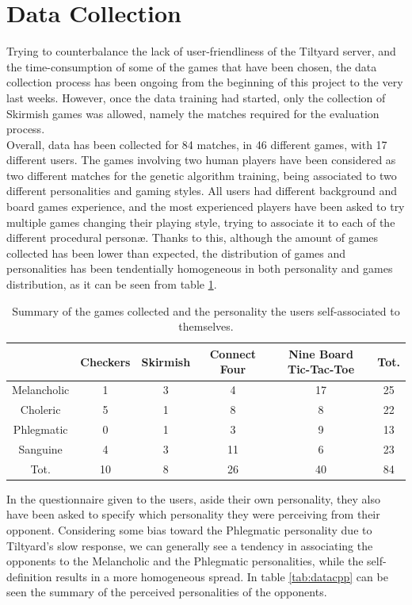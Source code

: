 \section{Data Collection}\label{subsec:dataresults}
Trying to counterbalance the lack of user-friendliness of the Tiltyard server, and the time-consumption of some of the games that have been chosen, the data collection process has been ongoing from the beginning of this project to the very last weeks. However, once the data training had started, only the collection of Skirmish games was allowed, namely the matches required for the evaluation process.\\
Overall, data has been collected for 84 matches, in 46 different games, with 17 different users. The games involving two human players have been considered as two different matches for the genetic algorithm training, being associated to two different personalities and gaming styles. All users had different background and board games experience, and the most experienced players have been asked to try multiple games changing their playing style, trying to associate it to each of the different procedural personæ. Thanks to this, although the amount of games collected has been lower than expected, the distribution of games and personalities has been tendentially homogeneous in both personality and games distribution, as it can be seen from table \ref{tab:datac}.\\
\begin{table}[h]
    \caption{Summary of the games collected and the personality the users self-associated to themselves.}
    \centering
    \scriptsize
	\begin{tabular}{|c|c|c|c|c||c|}
    	\hline
					& Checkers & Skirmish & Connect Four & Nine Board Tic-Tac-Toe & Tot. \\
        \hline
        Melancholic & 1  & 3 & 4  & 17 & 25 \\
        \hline
        Choleric	& 5  & 1 & 8  & 8  & 22 \\
        \hline
        Phlegmatic	& 0  & 1 & 3  & 9  & 13 \\
        \hline
        Sanguine	& 4  & 3 & 11 & 6  & 23 \\
        \hline \hline
        Tot.		& 10 & 8 & 26 & 40 & 84 \\
        \hline
	\end{tabular}
    \label{tab:datac}
\end{table}
\noindent In the questionnaire given to the users, aside their own personality, they also have been asked to specify which personality they were perceiving from their opponent. Considering some bias toward the Phlegmatic personality due to Tiltyard's slow response, we can generally see a tendency in associating the opponents to the Melancholic and the Phlegmatic personalities, while the self-definition results in a more homogeneous spread. In table \ref{tab:datacpp} can be seen the summary of the perceived personalities of the opponents.\\
